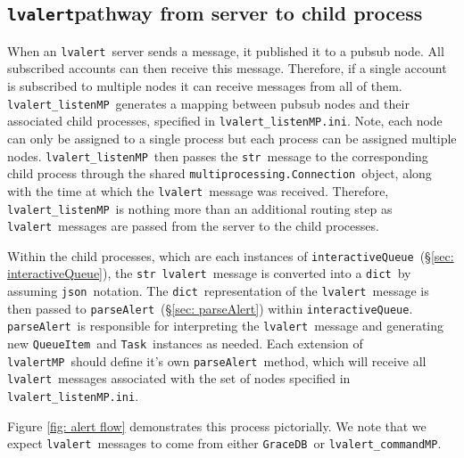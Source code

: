 \documentclass{article}
\newcommand{\multiprocessingConnection}{\texttt{multiprocessing.Connection}}
\newcommand{\GraceDB}{\texttt{GraceDB}}
\newcommand{\alert}{\texttt{lvalert}}
\newcommand{\lvalertMP}{\texttt{lvalertMP}}
\newcommand{\lvalertListenMP}{\texttt{lvalert\_listenMP}}
\newcommand{\lvalertCommandMP}{\texttt{lvalert\_commandMP}}
\newcommand{\interactiveQueue}{\texttt{interactiveQueue}}
\newcommand{\parseAlert}{\texttt{parseAlert}}
\newcommand{\QueueItem}{\texttt{QueueItem}}
\newcommand{\Task}{\texttt{Task}}
\newcommand{\lvalertMPini}{\texttt{lvalert\_listenMP.ini}}
\newcommand{\pythonstr}{\texttt{str}}
\newcommand{\pythondict}{\texttt{dict}}
\newcommand{\json}{\texttt{json}}
\begin{document}

\subsection{\alert pathway from server to child process}
\label{sec: passing alerts}

When an \alert~server sends a message, it published it to a pubsub node.
All subscribed accounts can then receive this message.
Therefore, if a single account is subscribed to multiple nodes it can receive messages from all of them.
\lvalertListenMP~generates a mapping between pubsub nodes and their associated child processes, specified in \lvalertMPini.
Note, each node can only be assigned to a single process but each process can be assigned multiple nodes.
\lvalertListenMP~then passes the \pythonstr~message to the corresponding child process through the shared \multiprocessingConnection~object, along with the time at which the \alert~message was received.
Therefore, \lvalertListenMP~is nothing more than an additional routing step as \alert~messages are passed from the server to the child processes.

Within the child processes, which are each instances of \interactiveQueue~(\S\ref{sec: interactiveQueue}), the \pythonstr~\alert~message is converted into a \pythondict~by assuming \json~notation.
The \pythondict~representation of the \alert~message is then passed to \parseAlert~(\S\ref{sec: parseAlert}) within \interactiveQueue.
\parseAlert~is responsible for interpreting the \alert~message and generating new \QueueItem~and \Task~instances as needed.
Each extension of \lvalertMP~should define it's own \parseAlert~method, which will receive all \alert~messages associated with the set of nodes specified in \lvalertMPini. 

Figure \ref{fig: alert flow} demonstrates this process pictorially.
We note that we expect \alert~messages to come from either \GraceDB~or \lvalertCommandMP.
\end{document}
